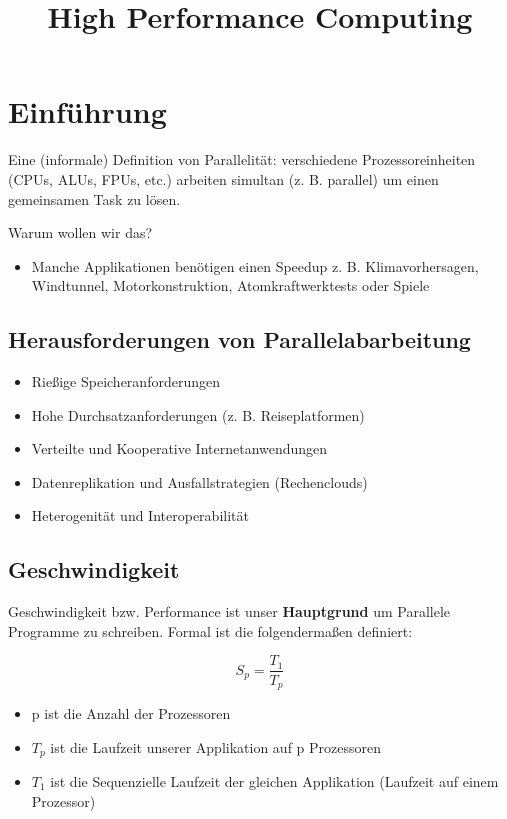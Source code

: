 \documentclass[twocolumn, a4paper, 10pt, DIV12]{scrreprt}
\title{High Performance Computing}
\begin{document}
\maketitle
\chapter*{Einführung}
Eine (informale) Definition von Parallelität: verschiedene Prozessoreinheiten 
(CPUs, ALUs, FPUs, etc.) arbeiten simultan (z. B. parallel) um einen gemeinsamen
Task zu lösen.

Warum wollen wir das?
\begin{itemize}
\item Manche Applikationen benötigen einen Speedup z. B. Klimavorhersagen,
        Windtunnel, Motorkonstruktion, Atomkraftwerktests oder Spiele
\end{itemize}

\section*{Herausforderungen von Parallelabarbeitung}
\begin{itemize}
\item Rießige Speicheranforderungen
\item Hohe Durchsatzanforderungen (z. B. Reiseplatformen)
\item Verteilte und Kooperative Internetanwendungen
\item Datenreplikation und Ausfallstrategien (Rechenclouds)
\item Heterogenität und Interoperabilität
\end{itemize}

\section*{Geschwindigkeit}
Geschwindigkeit bzw. Performance ist unser \textbf{Hauptgrund} um Parallele
Programme zu schreiben. Formal ist die  folgendermaßen definiert:

\[
S_p = \frac{T_1}{T_p}
\]

\begin{itemize}
    \item p ist die Anzahl der Prozessoren
    \item \(T_p\) ist die Laufzeit unserer Applikation auf p Prozessoren
    \item \(T_1\) ist die Sequenzielle Laufzeit der gleichen Applikation (Laufzeit auf einem Prozessor)
\end{itemize}
\end{document}
